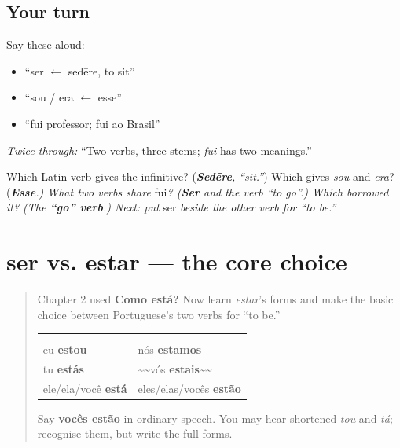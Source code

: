 \subsection*{Your turn}
Say these aloud:

\begin{itemize}
\raggedright
  \item “ser $\leftarrow$ sedēre, to sit”
  \item “sou / era $\leftarrow$ esse”
  \item “fui professor; fui ao Brasil”
\end{itemize}

\emph{Twice through:} “Two verbs, three stems; \emph{fui} has two meanings.”

\begin{tcolorbox}[breakable,colback=teal!4,colframe=teal!35!black,title={Before you move on}]
Which Latin verb gives the infinitive? (\emph{\textbf{Sedēre}, “sit.”}) Which gives \emph{sou} and \emph{era}? (\emph{\textbf{Esse}.) What two verbs share }fui\emph{? (\textbf{Ser} and the verb “to go”.) Which borrowed it? (The \textbf{“go” verb}.) Next: put }ser\emph{ beside the other verb for “to be.”}
\end{tcolorbox}
\section[ser vs. estar]{ser vs. estar — the core choice}

\label{lesson:PT-C16-ser-vs-estar}



\begin{quote}
Chapter 2 used \textbf{Como está?} Now learn \emph{estar}’s forms and make the basic choice between Portuguese’s two verbs for “to be.”

\noindent
\begin{tabularx}{\linewidth}{@{}>{\raggedright\arraybackslash}X>{\raggedright\arraybackslash}X@{}}
\toprule
\textbf{} & \textbf{} \\
\midrule
eu \textbf{estou} & nós \textbf{estamos} \\
tu \textbf{estás} & \textasciitilde{}\textasciitilde{}vós \textbf{estais}\textasciitilde{}\textasciitilde{} \\
ele/ela/você \textbf{está} & eles/elas/vocês \textbf{estão} \\
\bottomrule
\end{tabularx}

Say \textbf{vocês estão} in ordinary speech. You may hear shortened \emph{tou} and \emph{tá}; recognise them, but write the full forms.
\end{quote}

